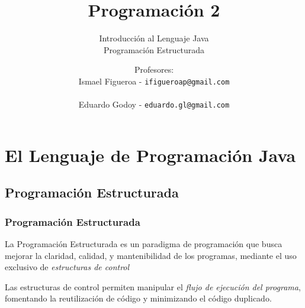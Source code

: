 \documentclass{beamer}
\title[\textbf{Programación 2}]{\textbf{Programación 2}}
\subtitle{Introducción al Lenguaje Java\\Programación Estructurada}
\author[IF-EG]
{Profesores:\\
  Ismael Figueroa -  \texttt{\small ifigueroap@gmail.com} \\
  \vspace{0.5mm} \\
  Eduardo Godoy - \texttt{\small eduardo.gl@gmail.com}
}
\institute[Universidad de Valparaíso]
\date{}
\begin{document}
\begin{frame}
  \titlepage
\end{frame}


\section{El Lenguaje de Programación Java}

\subsection{Programación Estructurada}

\begin{frame}
  \frametitle{Programación Estructurada}

  \begin{exampleblock}{}
    La Programación Estructurada es un paradigma de programación que
    busca mejorar la claridad, calidad, y mantenibilidad de los
    programas, mediante el uso exclusivo de \emph{estructuras de
      control}
  \end{exampleblock}

  \begin{exampleblock}{}
    Las estructuras de control permiten manipular el \emph{flujo de
      ejecución del programa}, fomentando la reutilización de código y
    minimizando el código duplicado.
  \end{exampleblock}
  
\end{frame}
\end{document}
